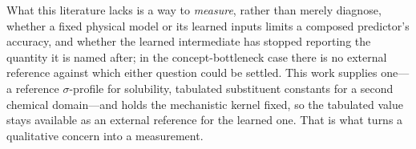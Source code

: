 What this literature lacks is a way to \emph{measure}, rather than merely diagnose, whether a fixed
physical model or its learned inputs limits a composed predictor's accuracy, and whether the learned
intermediate has stopped reporting the quantity it is named after; in the concept-bottleneck case
there is no external reference against which either question could be settled. This work supplies
one---a reference $\sigma$-profile for solubility, tabulated substituent constants for a second
chemical domain---and holds the mechanistic kernel fixed, so the tabulated value stays available as
an external reference for the learned one. That is what turns a qualitative concern into a
measurement.
